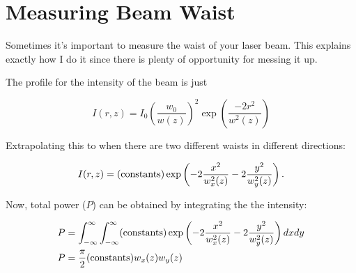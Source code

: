 




%

\chapter{Measuring Beam Waist}
\label{BeamWaistAppendix}

Sometimes it's important to measure the waist of your laser beam. This explains exactly how I do it since there is plenty of opportunity for messing it up. 
  
The profile for the intensity of the beam is just 

\begin{equation} \label{electricFieldExplicitForm}
I(r,z)=I_0\left(\frac{w_0}{w(z)}\right)^2 \exp \left(\frac{-2 r^2}{w^2(z)}\right)
\end{equation}

Extrapolating this to when there are two different waists in different directions: 

\begin{equation}
I(r,z)= ({\rm constants})\exp \left(-2\frac{x^2}{w_x^2(z)}-2\frac{y^2}{w_y^2(z)}\right) . 
\end{equation}

Now, total power ($P$) can be obtained by integrating the the intensity: 

\begin{align}
P&=\int_{-\infty}^{\infty}\int_{-\infty}^{\infty} ({\rm constants}) \exp \left(-2\frac{x^2}{w_x^2(z)}-2\frac{y^2}{w_y^2(z)}\right) dx dy\\
P&=\frac{\pi}{2} ({\rm constants}) w_x(z) w_y(z)
\end{align}

